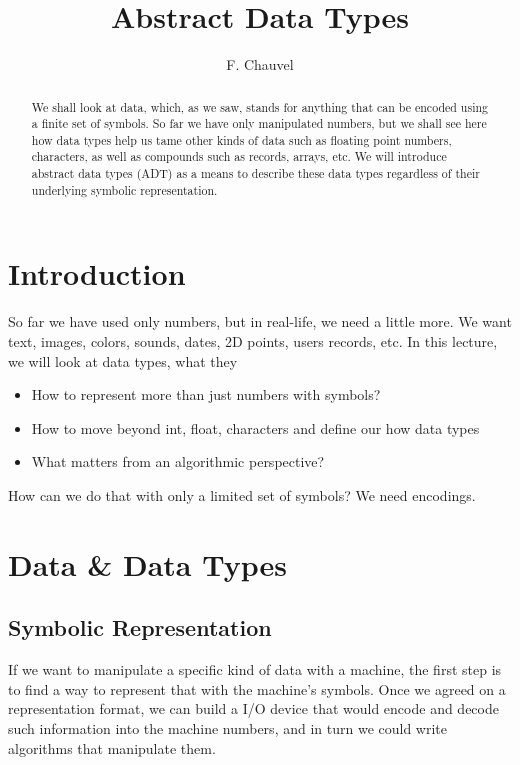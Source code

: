 \documentclass{aldast}
\title{Abstract Data Types}
\author{F. Chauvel}
\begin{document}
\maketitle

\begin{abstract}
  We shall look at data, which, as we saw, stands for anything that
  can be encoded using a finite set of symbols. So far we have only
  manipulated numbers, but we shall see here how data types help us
  tame other kinds of data such as floating point numbers, characters,
  as well as compounds such as records, arrays, etc. We will introduce
  abstract data types (ADT) as a means to describe these data types
  regardless of their underlying symbolic representation.
\end{abstract}


\section*{Introduction}

So far we have used only numbers, but in real-life, we need a little
more. We want text, images, colors, sounds, dates, 2D points, users
records, etc. In this lecture, we will look at data types, what they 

\begin{itemize}
  \item How to represent more than just numbers with symbols?
  \item How to move beyond int, float, characters and define our how data types 
  \item What matters from an algorithmic perspective?

\end{itemize}
How can we do that with only a limited set of symbols?
We need encodings.
 

\section{Data \& Data Types}

\subsection{Symbolic Representation}

If we want to manipulate a specific kind of data with a machine, the
first step is to find a way to represent that with the machine's
symbols. Once we agreed on a representation format, we can build a I/O
device that would encode and decode such information into the machine
numbers, and in turn we could write algorithms that manipulate them.
\end{document}
